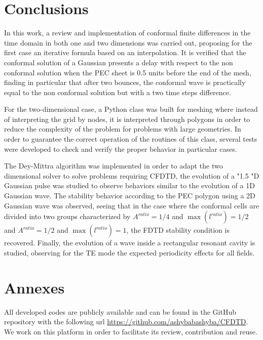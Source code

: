 \documentclass[12pt, oneside]{book}
\begin{document}
\chapter{Conclusions}

In this work, a review and implementation of conformal finite differences in the time domain in both one and two dimensions was carried out, proposing for the first case an iterative formula based on an interpolation. It is verified that the conformal solution of a Gaussian presents a delay with respect to the non conformal solution when the PEC sheet is 0.5 units before the end of the mesh, finding in particular that after two bounces, the conformal wave is practically equal to the non conformal solution but with a two time steps difference.

For the two-dimensional case, a Python class was built for meshing where instead of interpreting the grid by nodes, it is interpreted through polygons in order to reduce the complexity of the problem for problems with large geometries. In order to guarantee the correct operation of the routines of this class, several tests were developed to check and verify the proper behavior in particular cases.

The Dey-Mittra algorithm was implemented in order to adapt the two dimensional solver to solve problems requiring CFDTD, the evolution of a "1.5 "D Gaussian pulse was studied to observe behaviors similar to the evolution of a 1D Gaussian wave. The stability behavior according to the PEC polygon using a 2D Gaussian wave was observed, seeing that in the case where the conformal cells are divided into two groups characterized by $A^{ratio} = 1/4$ and $\max({l^{ratio}}) = 1/2$ and $A^{ratio} = 1/2$ and $\max({l^{ratio}}) = 1$, the FDTD stability condition is recovered. Finally, the evolution of a wave inside a rectangular resonant cavity is studied, observing for the TE mode the expected periodicity effects for all fields. 

\chapter{Annexes}

All developed codes are publicly available and can be found in the GitHub repository with the following url \url{https://github.com/ashybabashyba/CFDTD}. We work on this platform in order to facilitate its review, contribution and reuse.

\end{document}
